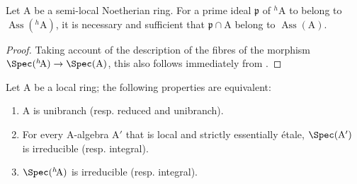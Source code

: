 \begin{corollary}[18.6.11]
\label{IV.18.6.11}
Let $\mathrm{A}$ be a semi-local Noetherian ring.
For a prime ideal $\mathfrak{p}$ of ${}^h\!\mathrm{A}$ to belong to $\operatorname{Ass}({}^h\!\mathrm{A})$, it is necessary and sufficient that $\mathfrak{p}\cap\mathrm{A}$ belong to $\operatorname{Ass}(\mathrm{A})$.
\end{corollary}

\begin{proof}
Taking account of the description of the fibres of the morphism $\Spec({}^h\!\mathrm{A})\to\Spec(\mathrm{A})$, this also follows immediately from .
\end{proof}

\begin{proposition}[18.6.12]
\label{IV.18.6.12}
Let $\mathrm{A}$ be a local ring;
the following properties are equivalent:
\begin{enumerate}[label=\emph{\alph*)}]
  \item A is unibranch  (resp. reduced and unibranch).
  \item For every A-algebra $\mathrm{A}'$ that is local and strictly essentially \'{e}tale, $\Spec(\mathrm{A}')$ is irreducible (resp. integral).
  \item $\Spec({}^h\!\mathrm{A})$ is irreducible (resp. integral).
\end{enumerate}
\end{proposition}

